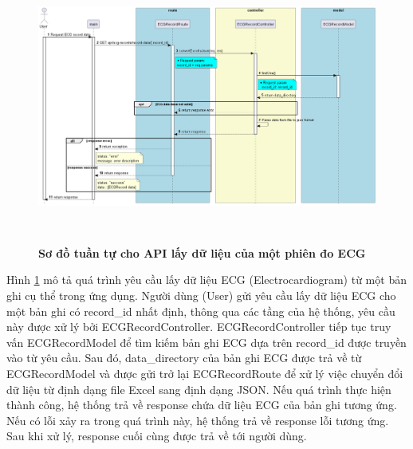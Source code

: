 \begin{enumerate}[a)]
\begin{figure}[H]
  \centering
  \includegraphics[width=16cm,height=9cm]{Images/server/sequence/server/convertExceltoJson.png}
  \caption[Sơ đồ tuần tự cho API lấy dữ liệu của một phiên đo ECG ]{\bfseries \fontsize{12pt}{0pt}
  \selectfont Sơ đồ tuần tự cho API lấy dữ liệu của một phiên đo ECG  }
  \label{convertExceltoJson} %
\end{figure}
Hình \ref{convertExceltoJson} mô tả quá trình yêu cầu lấy dữ liệu ECG (Electrocardiogram) từ một bản ghi cụ thể trong ứng dụng. Người dùng (User) gửi yêu cầu lấy dữ liệu ECG cho một bản ghi có record\_id nhất định, thông qua các tầng của hệ thống, yêu cầu này được xử lý bởi ECGRecordController. ECGRecordController tiếp tục truy vấn ECGRecordModel để tìm kiếm bản ghi ECG dựa trên record\_id được truyền vào từ yêu cầu. Sau đó, data\_directory của bản ghi ECG được trả về từ ECGRecordModel và được gửi trở lại ECGRecordRoute để xử lý việc chuyển đổi dữ liệu từ định dạng file Excel sang định dạng JSON. Nếu quá trình thực hiện thành công, hệ thống trả về response chứa dữ liệu ECG của bản ghi tương ứng. Nếu có lỗi xảy ra trong quá trình này, hệ thống trả về response lỗi tương ứng. Sau khi xử lý, response cuối cùng được trả về tới người dùng.


\end{enumerate}
